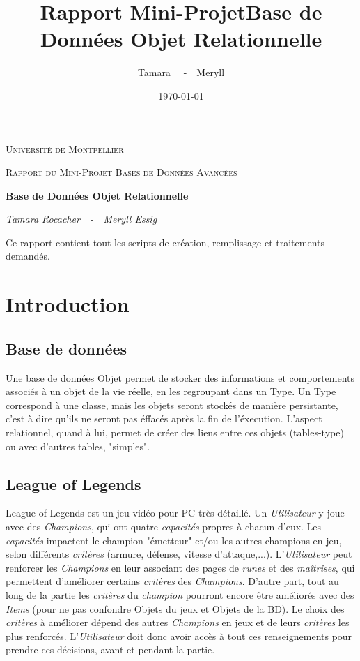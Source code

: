 \documentclass[a4paper,10pt]{report}
\title{\textbf{Rapport Mini-Projet}Base de Données Objet Relationnelle}
\author{Tamara \bsc{Rocacher}~~-~~Meryll \bsc{Essig}}
\date{\today}
\begin{document}
  \begin{titlepage}
  	\centering

{\scshape\LARGE Université de Montpellier \par}
  	\vspace{1cm}
{\scshape\Large Rapport du Mini-Projet Bases de Données Avancées\par}
  	\vspace{1.5cm}
    \vfill
  	{\huge\bfseries Base de Données Objet Relationnelle\par}
  	\vspace{2cm}


  	{\Large\itshape Tamara Rocacher~~-~~Meryll Essig\par}
  	\vspace{2cm}
  \vfill

 Ce rapport contient tout les scripts de création, remplissage et traitements demandés.

  \end{titlepage}


\tableofcontents


\chapter{Introduction} %
\section{Base de données}
  Une base de données Objet permet de stocker des informations et comportements associés à un objet de la vie réelle, en les regroupant dans un Type.
  Un Type correspond à une classe, mais les objets seront stockés de manière persistante, c'est à dire qu'ils ne seront pas éffacés après la fin de l'éxecution.
  L'aspect relationnel, quand à lui, permet de créer des liens entre ces objets (tables-type) ou avec d'autres tables, "simples".
\section{League of Legends}
  League of Legends est un jeu vidéo pour PC très détaillé. Un \textit{Utilisateur} y joue avec des \textit{Champions}, qui ont quatre \textit{capacités} propres à chacun d'eux. Les \textit{capacités} impactent le champion "émetteur" et/ou les autres champions en jeu, selon différents \textit{critères} (armure, défense, vitesse d'attaque,...). L'\textit{Utilisateur} peut renforcer les \textit{Champions} en leur associant des pages de  \textit{runes} et des \textit{maîtrises}, qui permettent d'améliorer certains \textit{critères} des \textit{Champions}. D'autre part, tout au long de la partie les \textit{critères} du \textit{champion} pourront encore être améliorés avec des \textit{Items} (pour ne pas confondre Objets du jeux et Objets de la BD).
  Le choix des \textit{critères} à améliorer dépend des autres \textit{Champions} en jeux et de leurs \textit{critères} les plus renforcés. L'\textit{Utilisateur} doit donc avoir accès à tout ces renseignements pour prendre ces décisions, avant et pendant la partie.
\end{document}

